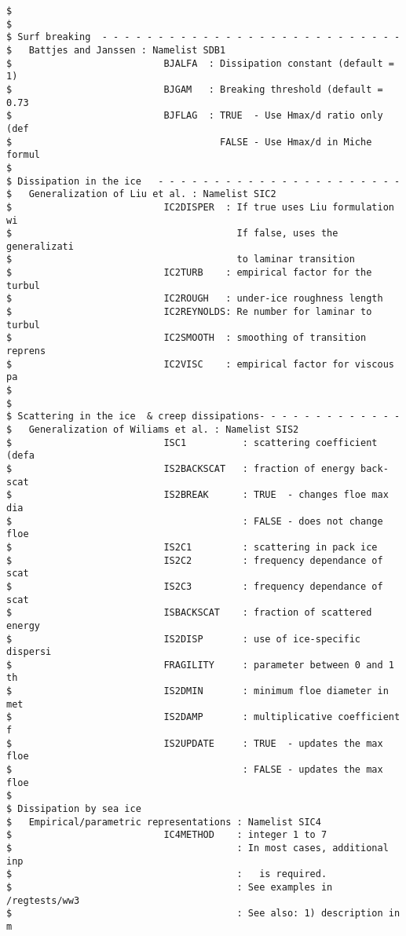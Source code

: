\begin{footnotesize}
\begin{verbatim}
$
$
$ Surf breaking  - - - - - - - - - - - - - - - - - - - - - - - - - - -
$   Battjes and Janssen : Namelist SDB1
$                           BJALFA  : Dissipation constant (default = 1)
$                           BJGAM   : Breaking threshold (default = 0.73
$                           BJFLAG  : TRUE  - Use Hmax/d ratio only (def
$                                     FALSE - Use Hmax/d in Miche formul
$
$ Dissipation in the ice   - - - - - - - - - - - - - - - - - - - - - - 
$   Generalization of Liu et al. : Namelist SIC2
$                           IC2DISPER  : If true uses Liu formulation wi
$                                        If false, uses the generalizati
$                                        to laminar transition 
$                           IC2TURB    : empirical factor for the turbul
$                           IC2ROUGH   : under-ice roughness length 
$                           IC2REYNOLDS: Re number for laminar to turbul
$                           IC2SMOOTH  : smoothing of transition reprens
$                           IC2VISC    : empirical factor for viscous pa
$
$
$ Scattering in the ice  & creep dissipations- - - - - - - - - - - - - 
$   Generalization of Wiliams et al. : Namelist SIS2
$                           ISC1          : scattering coefficient (defa
$                           IS2BACKSCAT   : fraction of energy back-scat
$                           IS2BREAK      : TRUE  - changes floe max dia
$                                         : FALSE - does not change floe
$                           IS2C1         : scattering in pack ice 
$                           IS2C2         : frequency dependance of scat
$                           IS2C3         : frequency dependance of scat
$                           ISBACKSCAT    : fraction of scattered energy
$                           IS2DISP       : use of ice-specific dispersi
$                           FRAGILITY     : parameter between 0 and 1 th
$                           IS2DMIN       : minimum floe diameter in met
$                           IS2DAMP       : multiplicative coefficient f
$                           IS2UPDATE     : TRUE  - updates the max floe
$                                         : FALSE - updates the max floe
$
$ Dissipation by sea ice
$   Empirical/parametric representations : Namelist SIC4
$                           IC4METHOD    : integer 1 to 7
$                                        : In most cases, additional inp
$                                        :   is required.
$                                        : See examples in /regtests/ww3
$                                        : See also: 1) description in m

\end{verbatim}
\end{footnotesize}
